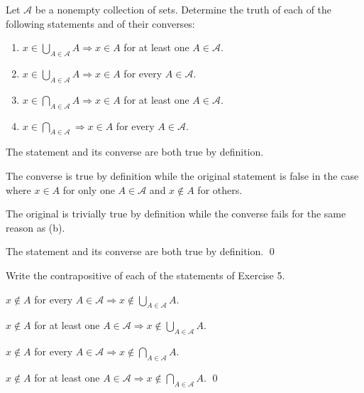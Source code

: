 \documentclass[a4paper,12pt]{article}
\begin{document}
\begin{exe}
	Let \( \mathcal{A} \) be a nonempty collection of sets.
	Determine the truth of each of the following statements and of their converses:
	\begin{enumerate}
		\item
		      \( x \in \bigcup_{A \in \mathcal{A}}A \Rightarrow  x \in A\) for at least one
		      \( A \in \mathcal{A} \).
		      
		\item
		      \( x \in \bigcup_{A \in \mathcal{A}}A \Rightarrow  x \in A\) for every
		      \( A \in \mathcal{A} \).
		      
		\item
		      \( x \in \bigcap_{A \in \mathcal{A}}A \Rightarrow  x \in A\) for at least one
		      \( A \in \mathcal{A} \).
		      
		\item
		      \( x \in \bigcap_{A \in \mathcal{A}} \Rightarrow  x \in A\) for every
		      \( A \in \mathcal{A} \).
	\end{enumerate}
\end{exe}\begin{sol}\leavevmode \par
	The statement and its converse are both true by definition.
	
	The converse is true by definition while the original statement is false in the case where \( x\in A \) for only one \( A\in \mathcal{A} \) and \( x \notin A \) for others.
	
	The original is trivially true by definition while the converse fails for the same reason as (b).
	
	The statement and its converse are both true by definition.
	\qed\end{sol}

\begin{exe}
	Write the contrapositive of each of the statements of Exercise 5.
\end{exe}\begin{sol}\leavevmode \par
	\( x \notin A \)
	for every
	\( A \in \mathcal{A} \Rightarrow x \notin \bigcup_{A \in \mathcal{A}} A\).
	
	\( x \notin A \)
	for at least one
	\( A \in \mathcal{A} \Rightarrow x \notin \bigcup_{A \in \mathcal{A}} A\).
	
	\( x \notin A \)
	for every
	\( A \in \mathcal{A} \Rightarrow x \notin \bigcap_{A \in \mathcal{A}} A\).
	
	\( x \notin A \)
	for at least one
	\( A \in \mathcal{A} \Rightarrow x \notin \bigcap_{A \in \mathcal{A}} A\).
	\qed\end{sol}
\end{document}

